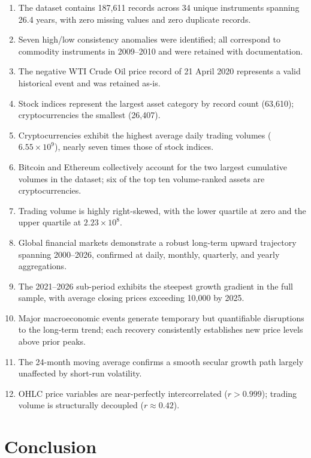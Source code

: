 \documentclass[10pt,a4paper,twocolumn]{article}
\begin{document}
\begin{enumerate}[leftmargin=1.4em, itemsep=2pt, topsep=2pt]
  \item The dataset contains 187,611 records across 34 unique instruments spanning 26.4 years, with zero missing values and zero duplicate records.
  \item Seven high/low consistency anomalies were identified; all correspond to commodity instruments in 2009--2010 and were retained with documentation.
  \item The negative WTI Crude Oil price record of 21 April 2020 represents a valid historical event and was retained as-is.
  \item Stock indices represent the largest asset category by record count (63,610); cryptocurrencies the smallest (26,407).
  \item Cryptocurrencies exhibit the highest average daily trading volumes ($6.55 \times 10^{9}$), nearly seven times those of stock indices.
  \item Bitcoin and Ethereum collectively account for the two largest cumulative volumes in the dataset; six of the top ten volume-ranked assets are cryptocurrencies.
  \item Trading volume is highly right-skewed, with the lower quartile at zero and the upper quartile at $2.23 \times 10^{8}$.
  \item Global financial markets demonstrate a robust long-term upward trajectory spanning 2000--2026, confirmed at daily, monthly, quarterly, and yearly aggregations.
  \item The 2021--2026 sub-period exhibits the steepest growth gradient in the full sample, with average closing prices exceeding 10,000 by 2025.
  \item Major macroeconomic events generate temporary but quantifiable disruptions to the long-term trend; each recovery consistently establishes new price levels above prior peaks.
  \item The 24-month moving average confirms a smooth secular growth path largely unaffected by short-run volatility.
  \item OHLC price variables are near-perfectly intercorrelated ($r > 0.999$); trading volume is structurally decoupled ($r \approx 0.42$).
\end{enumerate}

\section{Conclusion}
\end{document}

